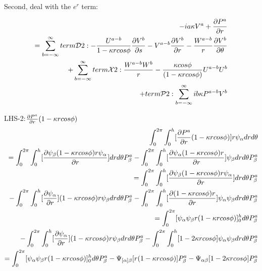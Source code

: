 \documentclass{Note}
\begin{document}
Second, deal with the $e^r$ term:

\begin{equation}
\begin{aligned}
-ia\kappa V^a+{\partial P^a\over {\partial r}}\\
=
\sum_{b=-\infty}^{\infty}
term\mathcal{D}2: -{U^{a-b}\over {1-\kappa r cos\phi}}  {{\partial V^b} \over {\partial s}}-V^{a-b}{{\partial V^b}\over{\partial r}}-{W^{a-b}\over r}{{\partial V^b}\over {\partial \theta}}\\
+ \sum_{b=-\infty}^{\infty}
term\mathcal{X}2: {W^{a-b}W^b\over{r}}-{\kappa cos\phi \over{(1-\kappa r cos\phi)}}U^{a-b}U^b\\
+term\mathcal{P}2:  \sum_{b=-\infty}^{\infty}
ib\kappa P^{a-b}V^{b}\\
\end{aligned}
\end{equation}

LHS-2:${\partial P^a \over \partial r }(1-\kappa r cos\phi)$
\begin{equation}
\begin{aligned}
\int_0^{2\pi} \int_0^h [{\partial P^a \over \partial r}(1-\kappa r cos\phi)] r\psi_\alpha dr d\theta\\
=\int_0^{2\pi} \int_0^h [{\partial \psi_\beta (1-\kappa r cos\phi) r\psi_\alpha \over \partial r}]dr d\theta P_\beta^a
-\int_0^{2\pi} \int_0^h [{\partial \psi_\alpha (1-\kappa r cos\phi) r \over \partial r}]\psi_\beta dr d\theta P_\beta^a\\
=\int_0^{2\pi} \int_0^h [{\partial \psi_\beta (1-\kappa r cos\phi) r\psi_\alpha \over \partial r}]dr d\theta P_\beta^a\\
-\int_0^{2\pi} \int_0^h [{\partial \psi_\alpha \over \partial r}](1-\kappa r cos\phi) r \psi_\beta dr d\theta P_\beta^a
-\int_0^{2\pi} \int_0^h [{\partial (1-\kappa r cos\phi)r   \over \partial r}] \psi_\alpha\psi_\beta dr d\theta P_\beta^a\\
=\int_0^{2\pi}  [{\psi_\alpha \psi_\beta   r(1-\kappa r cos\phi)}]_0^h d\theta P_\beta^a\\
-\int_0^{2\pi} \int_0^h [{\partial \psi_\alpha \over \partial r}](1-\kappa r cos\phi) r \psi_\beta dr d\theta P_\beta^a
-\int_0^{2\pi} \int_0^h [1-2\kappa rcos\phi] \psi_\alpha\psi_\beta dr d\theta P_\beta^a\\
=\int_0^{2\pi}  [{\psi_\alpha \psi_\beta   r(1-\kappa r cos\phi)}]_0^h d\theta P_\beta^a
-\Psi_{[\alpha]\beta}[r(1-\kappa r cos\phi)]P_\beta^a-\Psi_{\alpha\beta}[1-2\kappa r cos\phi]P_\beta^a
\end{aligned}
\end{equation}
\end{document}
